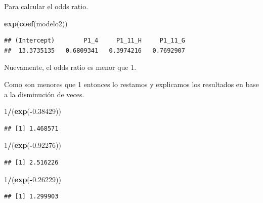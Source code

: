 \documentclass[
]{article}
\newenvironment{Shaded}{\begin{snugshade}}{\end{snugshade}}
\newcommand{\DecValTok}[1]{\textcolor[rgb]{0.00,0.00,0.81}{#1}}
\newcommand{\FloatTok}[1]{\textcolor[rgb]{0.00,0.00,0.81}{#1}}
\newcommand{\FunctionTok}[1]{\textcolor[rgb]{0.13,0.29,0.53}{\textbf{#1}}}
\newcommand{\NormalTok}[1]{#1}
\newcommand{\SpecialCharTok}[1]{\textcolor[rgb]{0.81,0.36,0.00}{\textbf{#1}}}
\begin{document}
Para calcular el odds ratio.

\begin{Shaded}
\begin{Highlighting}[]
\FunctionTok{exp}\NormalTok{(}\FunctionTok{coef}\NormalTok{(modelo2)) }
\end{Highlighting}
\end{Shaded}

\begin{verbatim}
## (Intercept)        P1_4     P1_11_H     P1_11_G 
##  13.3735135   0.6809341   0.3974216   0.7692907
\end{verbatim}

Nuevamente, el odds ratio es menor que 1.

Como son menores que 1 entonces lo restamos y explicamos los resultados
en base a la disminución de veces.

\begin{Shaded}
\begin{Highlighting}[]
\DecValTok{1}\SpecialCharTok{/}\NormalTok{(}\FunctionTok{exp}\NormalTok{(}\SpecialCharTok{{-}}\FloatTok{0.38429}\NormalTok{))}
\end{Highlighting}
\end{Shaded}

\begin{verbatim}
## [1] 1.468571
\end{verbatim}

\begin{Shaded}
\begin{Highlighting}[]
\DecValTok{1}\SpecialCharTok{/}\NormalTok{(}\FunctionTok{exp}\NormalTok{(}\SpecialCharTok{{-}}\FloatTok{0.92276}\NormalTok{))}
\end{Highlighting}
\end{Shaded}

\begin{verbatim}
## [1] 2.516226
\end{verbatim}

\begin{Shaded}
\begin{Highlighting}[]
\DecValTok{1}\SpecialCharTok{/}\NormalTok{(}\FunctionTok{exp}\NormalTok{(}\SpecialCharTok{{-}}\FloatTok{0.26229}\NormalTok{))}
\end{Highlighting}
\end{Shaded}

\begin{verbatim}
## [1] 1.299903
\end{verbatim}
\end{document}
